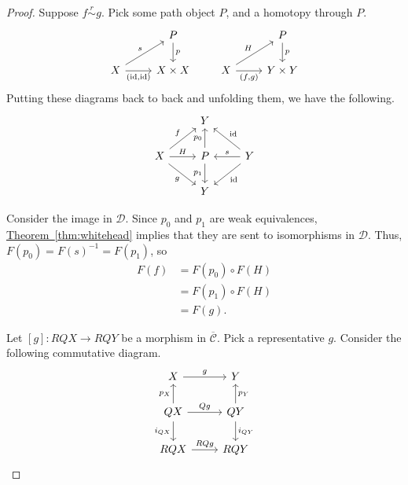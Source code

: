 \documentclass[main.tex]{subfiles}
\begin{document}
\begin{proof}
  Suppose $f \overset{r}{\sim} g$. Pick some path object $P$, and a homotopy through $P$.
  \begin{equation*}
    \begin{tikzcd}
      & P
      \arrow[d, "p"]
      \\
      X
      \arrow[r, swap, "{(\id, \id)}"]
      \arrow[ur, "s"]
      & X \times X
    \end{tikzcd}
    \qquad
    \begin{tikzcd}
      & P
      \arrow[d, "p"]
      \\
      X
      \arrow[r, swap, "{(f, g)}"]
      \arrow[ur, "H"]
      & Y \times Y
    \end{tikzcd}
  \end{equation*}
  Putting these diagrams back to back and unfolding them, we have the following.
  \begin{equation*}
    \begin{tikzcd}
      & Y
      \\
      X
      \arrow[ur, "f"]
      \arrow[r, "H"]
      \arrow[dr, swap, "g"]
      & P
      \arrow[u, "p_{0}"]
      \arrow[d, swap, "p_{1}"]
      & Y
      \arrow[ul, swap, "\id"]
      \arrow[l, swap, "s"]
      \arrow[dl, "\id"]
      \\
      & Y
    \end{tikzcd}
  \end{equation*}

  Consider the image in $\mathcal{D}$. Since $p_{0}$ and $p_{1}$ are weak equivalences, \hyperref[thm:whitehead]{Theorem~\ref*{thm:whitehead}} implies that they are sent to isomorphisms in $\mathcal{D}$. Thus, $F(p_{0}) = F(s)^{-1} = F(p_{1})$, so
  \begin{align*}
    F(f) &= F(p_{0}) \circ F(H) \\
    &= F(p_{1}) \circ F(H) \\
    &= F(g).
  \end{align*}

  Let $[g]\colon RQX \to RQY$ be a morphism in $\overline{\mathcal{C}}$. Pick a representative $g$. Consider the following commutative diagram.
  \begin{equation*}
    \begin{tikzcd}
      X
      \arrow[r, "g"]
      \arrow[d, leftarrow, swap, "p_{X}"]
      & Y
      \arrow[d, leftarrow, "p_{Y}"]
      \\
      QX
      \arrow[r, "Qg"]
      \arrow[d, swap, "i_{QX}"]
      & QY
      \arrow[d, "i_{QY}"]
      \\
      RQX
      \arrow[r, "RQg"]
      & RQY
    \end{tikzcd}
  \end{equation*}


\end{proof}
\end{document}
